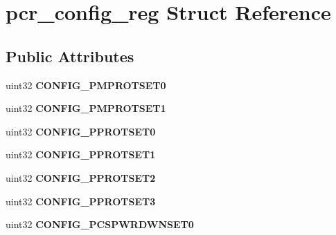\hypertarget{structpcr__config__reg}{}\section{pcr\+\_\+config\+\_\+reg Struct Reference}
\label{structpcr__config__reg}
\subsection*{Public Attributes}
\begin{DoxyCompactItemize}
\item 
\mbox{\label{structpcr__config__reg_a702112b05a8d8d548749ca8fd5a28fea}} 
uint32 {\bfseries C\+O\+N\+F\+I\+G\+\_\+\+P\+M\+P\+R\+O\+T\+S\+E\+T0}
\item 
\mbox{\label{structpcr__config__reg_a2b1958af00846c1ff9706dd52d3bcf39}} 
uint32 {\bfseries C\+O\+N\+F\+I\+G\+\_\+\+P\+M\+P\+R\+O\+T\+S\+E\+T1}
\item 
\mbox{\label{structpcr__config__reg_a3bb2923db8714c6bb5ba73bd19508b5e}} 
uint32 {\bfseries C\+O\+N\+F\+I\+G\+\_\+\+P\+P\+R\+O\+T\+S\+E\+T0}
\item 
\mbox{\label{structpcr__config__reg_aa3a36dfb36a3bb8bbb3d7091fdd60f86}} 
uint32 {\bfseries C\+O\+N\+F\+I\+G\+\_\+\+P\+P\+R\+O\+T\+S\+E\+T1}
\item 
\mbox{\label{structpcr__config__reg_ae1bee5b20987ffb115747a1605c8863a}} 
uint32 {\bfseries C\+O\+N\+F\+I\+G\+\_\+\+P\+P\+R\+O\+T\+S\+E\+T2}
\item 
\mbox{\label{structpcr__config__reg_ac2e98d8b4e53aab07df07ecc2aab0062}} 
uint32 {\bfseries C\+O\+N\+F\+I\+G\+\_\+\+P\+P\+R\+O\+T\+S\+E\+T3}
\item 
\mbox{\label{structpcr__config__reg_a6f4b0a7ef8d193e33f92ec8e082b13e1}} 
uint32 {\bfseries C\+O\+N\+F\+I\+G\+\_\+\+P\+C\+S\+P\+W\+R\+D\+W\+N\+S\+E\+T0}
\item 
\mbox{\label{structpcr__config__reg_afca5412c1245cd52541e8e7cc18abb09}} 

\end{DoxyCompactItemize}
